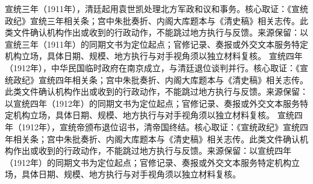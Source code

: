 宣统三年（1911年），清廷起用袁世凯处理北方军政和议和事务。核心取证：《宣统政纪》宣统三年相关条；宫中朱批奏折、内阁大库题本与《清史稿》相关志传。此类文件确认机构作出或收到的行政动作，不能跳过地方执行与反馈。来源保留：以宣统三年（1911年）的同期文书为定位起点；官修记录、奏报或外交文本服务特定机构立场，具体日期、规模、地方执行与对手视角须以独立材料复核。
宣统四年（1912年），中华民国临时政府在南京成立，与清廷退位谈判并行。核心取证：《宣统政纪》宣统四年相关条；宫中朱批奏折、内阁大库题本与《清史稿》相关志传。此类文件确认机构作出或收到的行政动作，不能跳过地方执行与反馈。来源保留：以宣统四年（1912年）的同期文书为定位起点；官修记录、奏报或外交文本服务特定机构立场，具体日期、规模、地方执行与对手视角须以独立材料复核。
宣统四年（1912年），宣统帝颁布退位诏书，清帝国终结。核心取证：《宣统政纪》宣统四年相关条；宫中朱批奏折、内阁大库题本与《清史稿》相关志传。此类文件确认机构作出或收到的行政动作，不能跳过地方执行与反馈。来源保留：以宣统四年（1912年）的同期文书为定位起点；官修记录、奏报或外交文本服务特定机构立场，具体日期、规模、地方执行与对手视角须以独立材料复核。
